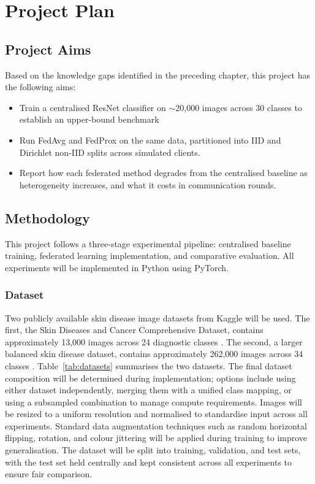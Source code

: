 \documentclass[12pt,openany,a4paper]{book}
\begin{document}
\chapter{Project Plan}
\section{Project Aims}
Based on the knowledge gaps identified in the preceding chapter, this project has the following aims:

\begin{itemize}
  \item Train a centralised ResNet classifier on $\sim$20,000 images across 30 classes to establish an upper-bound benchmark
  \item Run FedAvg and FedProx on the same data, partitioned into IID and Dirichlet non-IID splits across simulated clients.
  \item Report how each federated method degrades from the centralised baseline as heterogeneity increases, and what it costs in communication rounds.
\end{itemize}

\section{Methodology}
This project follows a three-stage experimental pipeline: centralised baseline training, federated learning implementation, and comparative evaluation. All experiments will be implemented in Python using PyTorch.

\subsection{Dataset}
Two publicly available skin disease image datasets from Kaggle will be used. The first, the Skin Diseases and Cancer Comprehensive Dataset, contains approximately 13,000 images across 24 diagnostic classes \cite{SkinDiseasesCancer}. The second, a larger balanced skin disease dataset, contains approximately 262,000 images across 34 classes \cite{MassiveSkinDisease}. Table~\ref{tab:datasets} summarises the two datasets. The final dataset composition will be determined during implementation; options include using either dataset independently, merging them with a unified class mapping, or using a subsampled combination to manage compute requirements. Images will be resized to a uniform resolution and normalised to standardise input across all experiments. Standard data augmentation techniques such as random horizontal flipping, rotation, and colour jittering will be applied during training to improve generalisation. The dataset will be split into training, validation, and test sets, with the test set held centrally and kept consistent across all experiments to ensure fair comparison. 
\end{document}
